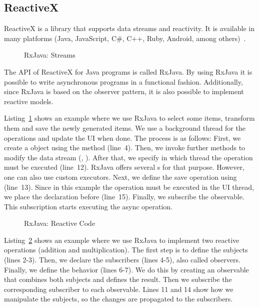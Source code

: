 \documentclass[type=bsc,accentcolor=tud9c]{tudthesis}
\newcommand{\framework}[1]{\textcolor{black!65}{#1}}
\begin{document}
\subsection{ReactiveX}
\framework{ReactiveX} is a library that supports data streams and reactivity. It is available in many platforms (\framework{Java}, \framework{JavaScript}, \framework{C\#}, \framework{C++}, \framework{Ruby}, \framework{Android}, among others)~\cite{reactiveX}. 

\begin{figure}[]
\begin{sourcecode}

\caption{RxJava: Streams}
\label{code:rxJava-streams}
\end{sourcecode}
\end{figure}

The API of \framework{ReactiveX} for \framework{Java} programs is called \framework{RxJava}. By using \framework{RxJava} it is possible to write asynchronous programs in a functional fashion. Additionally, since \framework{RxJava} is based on the observer pattern, it is also possible to implement reactive models.

Listing~\ref{code:rxJava-streams} shows an example where we use \framework{RxJava} to select some items, transform them and save the newly generated items. We use a background thread for the operations and update the UI when done. The process is as follows: First, we create a  object using the method  (line~4). Then, we invoke further methods to modify the data stream (, ). After that, we specify in which thread the operation must be executed (line~12). RxJava offers several s for that purpose. However, one can also use custom executors. Next, we define the save operation using  (line~13). Since in this example the  operation must be executed in the UI thread, we place the  declaration before  (line~15). Finally, we subscribe the observable. This subscription starts executing the async operation.

\begin{figure}[t]
\begin{sourcecode}

\caption{RxJava: Reactive Code}
\label{code:rxJava-reactive-code}
\end{sourcecode}
\end{figure}

Listing~\ref{code:rxJava-reactive-code} shows an example where we use \framework{RxJava} to implement two reactive operations (addition and multiplication). The first step is to define the subjects (lines 2-3). Then, we declare the subscribers (lines 4-5), also called observers. Finally, we define the behavior (lines 6-7). We do this by creating an observable that combines both subjects and defines the result. Then we subscribe the corresponding subscriber to each observable. Lines 11 and 14 show how we manipulate the subjects, so the changes are propagated to the subscribers.
\end{document}
